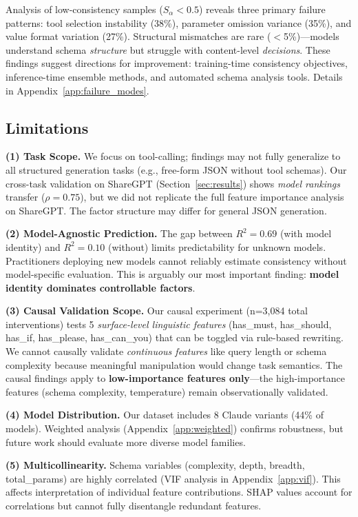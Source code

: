 \documentclass[sigconf,anonymous,review]{acmart}
\begin{document}
Analysis of low-consistency samples ($S_\alpha < 0.5$) reveals three primary failure patterns: tool selection instability (38\%), parameter omission variance (35\%), and value format variation (27\%). Structural mismatches are rare ($<$5\%)---models understand schema \textit{structure} but struggle with content-level \textit{decisions}. These findings suggest directions for improvement: training-time consistency objectives, inference-time ensemble methods, and automated schema analysis tools. Details in Appendix~\ref{app:failure_modes}.

\subsection{Limitations}

\textbf{(1) Task Scope.} We focus on tool-calling; findings may not fully generalize to all structured generation tasks (e.g., free-form JSON without tool schemas). Our cross-task validation on ShareGPT (Section~\ref{sec:results}) shows \textit{model rankings} transfer ($\rho = 0.75$), but we did not replicate the full feature importance analysis on ShareGPT. The factor structure may differ for general JSON generation.

\textbf{(2) Model-Agnostic Prediction.} The gap between $R^2=0.69$ (with model identity) and $R^2=0.10$ (without) limits predictability for unknown models. Practitioners deploying new models cannot reliably estimate consistency without model-specific evaluation. This is arguably our most important finding: \textbf{model identity dominates controllable factors}.

\textbf{(3) Causal Validation Scope.} Our causal experiment (n=3,084 total interventions) tests 5 \textit{surface-level linguistic features} (has\_must, has\_should, has\_if, has\_please, has\_can\_you) that can be toggled via rule-based rewriting. We cannot causally validate \textit{continuous features} like query length or schema complexity because meaningful manipulation would change task semantics. The causal findings apply to \textbf{low-importance features only}---the high-importance features (schema complexity, temperature) remain observationally validated.

\textbf{(4) Model Distribution.} Our dataset includes 8 Claude variants (44\% of models). Weighted analysis (Appendix~\ref{app:weighted}) confirms robustness, but future work should evaluate more diverse model families.

\textbf{(5) Multicollinearity.} Schema variables (complexity, depth, breadth, total\_params) are highly correlated (VIF analysis in Appendix~\ref{app:vif}). This affects interpretation of individual feature contributions. SHAP values account for correlations but cannot fully disentangle redundant features.
\end{document}
